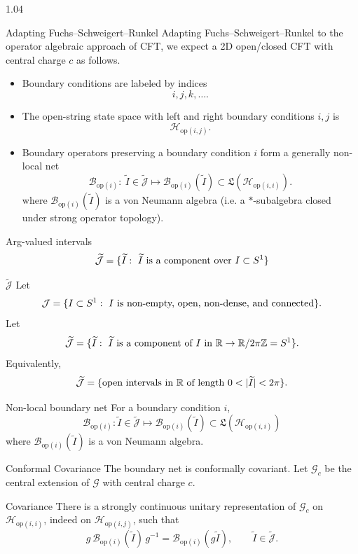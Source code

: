 \documentclass[xcolor={dvipsnames}]{beamer}
\theoremstyle{definition}
\theoremstyle{plain}
\newcommand{\MB}{\mathcal{B}}
\newcommand{\MH}{\mathcal{H}}
\newcommand{\MJ}{\mathcal{J}}
\newcommand{\MG}{\mathscr{G}}
\newcommand{\Rbb}{\mathbb{R}}
\newcommand{\Zbb}{\mathbb{Z}}
\newcommand{\op}{\mathrm{op}}
\newcommand{\Hopij}[2]{\MH_{\op(#1,#2)}}
\newcommand{\Bopi}[1]{\MB_{\op(#1)}}
\newcommand{\Jt}{\widetilde{\MJ}}
\newcommand{\Gc}{\MG_c}
\begin{document}
\begin{spacing}{1.04}
\begin{frame}[t]{Adapting Fuchs--Schweigert--Runkel}
\footnotesize
Adapting Fuchs--Schweigert--Runkel to the operator algebraic approach of CFT, we expect a 2D open/closed CFT with central charge $c$ as follows.

\begin{itemize}
  \item Boundary conditions are labeled by indices
  \[
    i,j,k,\ldots .
  \]
  \item The open-string state space with left and right boundary conditions $i,j$ is
  \[
    \Hopij{i}{j}.
  \]
  \item Boundary operators preserving a boundary condition $i$ form a generally non-local net
  \[
    \Bopi{i}:\ \widetilde I\in\Jt\longmapsto
    \Bopi{i}(\widetilde I)\subset \mathfrak L(\Hopij{i}{i}).
  \]
where $\Bopi{i}(\widetilde I)$ is a von Neumann algebra (i.e. a $*$-subalgebra closed under strong operator topology).
\end{itemize}

\begin{block}{Arg-valued intervals}
\[
  \Jt=\{\widetilde I:\ \widetilde I
  \hbox{ is a component over } I\subset S^1\}
\]
\end{block}
\end{frame}

\begin{frame}[t]{$\Jt$}
\small
Let
\[
  \MJ=\{I\subset S^1:\ I\hbox{ is non-empty, open, non-dense, and connected}\}.
\]
Let
\[
  \Jt=\{\widetilde I:\ \widetilde I
  \hbox{ is a component of } I
  \hbox{ in } \Rbb\to\Rbb/2\pi\Zbb=S^1\}.
\]
Equivalently,
\[
  \Jt=\{\hbox{open intervals in }\Rbb\hbox{ of length }0<|\widetilde I|<2\pi\}.
\]

\begin{block}{Non-local boundary net}
For a boundary condition $i$,
\[
  \Bopi{i}:\widetilde I\in\Jt\longmapsto
  \Bopi{i}(\widetilde I)\subset \mathfrak L(\Hopij{i}{i})
\]
where $ \Bopi{i}(\widetilde I)$ is a von Neumann algebra.
\end{block}
\end{frame}

\begin{frame}[t]{Conformal Covariance}
\small
The boundary net is conformally covariant.  Let $\Gc$ be the central extension of $\MG$ with central charge $c$.

\begin{block}{Covariance}
There is a strongly continuous unitary representation of $\Gc$ on $\Hopij{i}{i}$, indeed on $\Hopij{i}{j}$, such that
\[
  g\,\Bopi{i}(\widetilde I)\,g^{-1}
  =
  \Bopi{i}(g\widetilde I),
  \qquad \widetilde I\in\Jt .
\]
\end{block}


\end{frame}
\end{spacing}
\end{document}
